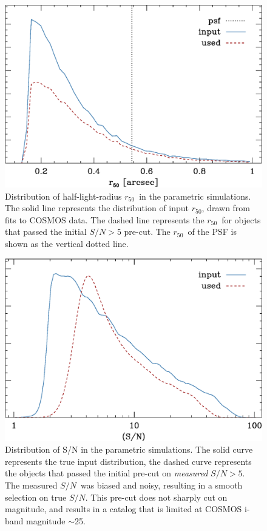 \documentclass[iop]{emulateapj}
\newcommand{\snr}{$S/N$}
\newcommand{\hlr}{$r_{50}$}
\begin{document}
\begin{figure}
    \centering
    \includegraphics[width=\columnwidth]{run-bdj03mcal02-r50.eps}

    \caption{Distribution of half-light-radius \hlr\ in the parametric simulations.
        The solid line represents the distribution of input \hlr, drawn from fits
        to COSMOS data.  The dashed line represents the \hlr\ for objects that passed
		the initial $S/N > 5$ pre-cut.  The \hlr\ of the PSF is shown as the vertical dotted
        line.}

\label{fig:psimhlrcompare}
\end{figure}


\begin{figure}
    \centering
    \includegraphics[width=\columnwidth]{run-bdj03mcal02-s2n.eps}

    \caption{Distribution of S/N in the parametric simulations. The
    solid curve represents the true input distribution, the dashed curve 
	represents the objects that passed the initial pre-cut on {\it measured}
    \snr$ > 5$. The measured \snr\ was biased and noisy,
    resulting in a smooth selection on true \snr.  This pre-cut
    does not sharply cut on magnitude, and results in a catalog that is
    limited at COSMOS i-band magnitude $\sim$25.}

\label{fig:s2n}
\end{figure}
\end{document}
